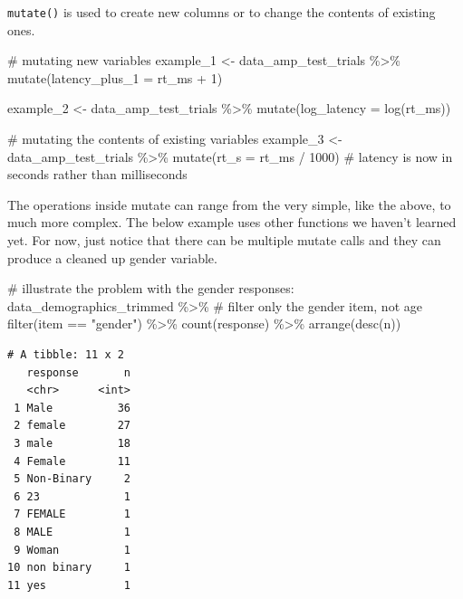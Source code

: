 \documentclass[
  letterpaper,
  DIV=11,
  numbers=noendperiod]{scrreprt}
\newenvironment{Shaded}{\begin{snugshade}}{\end{snugshade}}
\newcommand{\AttributeTok}[1]{\textcolor[rgb]{0.40,0.45,0.13}{#1}}
\newcommand{\CommentTok}[1]{\textcolor[rgb]{0.37,0.37,0.37}{#1}}
\newcommand{\DecValTok}[1]{\textcolor[rgb]{0.68,0.00,0.00}{#1}}
\newcommand{\FunctionTok}[1]{\textcolor[rgb]{0.28,0.35,0.67}{#1}}
\newcommand{\NormalTok}[1]{\textcolor[rgb]{0.00,0.23,0.31}{#1}}
\newcommand{\OtherTok}[1]{\textcolor[rgb]{0.00,0.23,0.31}{#1}}
\newcommand{\SpecialCharTok}[1]{\textcolor[rgb]{0.37,0.37,0.37}{#1}}
\newcommand{\StringTok}[1]{\textcolor[rgb]{0.13,0.47,0.30}{#1}}
\begin{document}
\texttt{mutate()} is used to create new columns or to change the
contents of existing ones.

\begin{Shaded}
\begin{Highlighting}[]
\CommentTok{\# mutating new variables}
\NormalTok{example\_1 }\OtherTok{\textless{}{-}}\NormalTok{ data\_amp\_test\_trials }\SpecialCharTok{\%\textgreater{}\%}
  \FunctionTok{mutate}\NormalTok{(}\AttributeTok{latency\_plus\_1 =}\NormalTok{ rt\_ms }\SpecialCharTok{+} \DecValTok{1}\NormalTok{)}

\NormalTok{example\_2 }\OtherTok{\textless{}{-}}\NormalTok{ data\_amp\_test\_trials }\SpecialCharTok{\%\textgreater{}\%}
  \FunctionTok{mutate}\NormalTok{(}\AttributeTok{log\_latency =} \FunctionTok{log}\NormalTok{(rt\_ms))}

\CommentTok{\# mutating the contents of existing variables}
\NormalTok{example\_3 }\OtherTok{\textless{}{-}}\NormalTok{ data\_amp\_test\_trials }\SpecialCharTok{\%\textgreater{}\%}
  \FunctionTok{mutate}\NormalTok{(}\AttributeTok{rt\_s =}\NormalTok{ rt\_ms }\SpecialCharTok{/} \DecValTok{1000}\NormalTok{) }\CommentTok{\# latency is now in seconds rather than milliseconds}
\end{Highlighting}
\end{Shaded}

The operations inside mutate can range from the very simple, like the
above, to much more complex. The below example uses other functions we
haven't learned yet. For now, just notice that there can be multiple
mutate calls and they can produce a cleaned up gender variable.

\begin{Shaded}
\begin{Highlighting}[]
\CommentTok{\# illustrate the problem with the gender responses:}
\NormalTok{data\_demographics\_trimmed }\SpecialCharTok{\%\textgreater{}\%}
  \CommentTok{\# filter only the gender item, not age}
  \FunctionTok{filter}\NormalTok{(item }\SpecialCharTok{==} \StringTok{"gender"}\NormalTok{) }\SpecialCharTok{\%\textgreater{}\%}
  \FunctionTok{count}\NormalTok{(response) }\SpecialCharTok{\%\textgreater{}\%}
  \FunctionTok{arrange}\NormalTok{(}\FunctionTok{desc}\NormalTok{(n))}
\end{Highlighting}
\end{Shaded}

\begin{verbatim}
# A tibble: 11 x 2
   response       n
   <chr>      <int>
 1 Male          36
 2 female        27
 3 male          18
 4 Female        11
 5 Non-Binary     2
 6 23             1
 7 FEMALE         1
 8 MALE           1
 9 Woman          1
10 non binary     1
11 yes            1
\end{verbatim}
\end{document}
